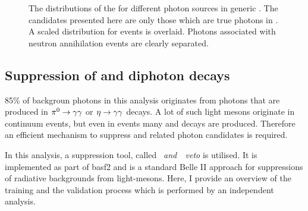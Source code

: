 \begin{figure}[htbp!]
    \centering
    \caption{\label{fig:zmva_distribution_sources} The distributions of the \ZMVA for different photon sources in generic \MC.
    The candidates presented here are only those which are true photons in .
    A scaled \ZMVA distribution for \BtoXsgamma events is overlaid.
    Photons associated with neutron annihilation events are clearly separated.}
\end{figure}

\subsection{Suppression of \texorpdfstring{\piz}{pi0} and \texorpdfstring{\eta}{eta} diphoton decays}\label{sec:selection_vetos}

85\% of backgroun photons in this analysis originates from photons that are produced in $\pi^0\rightarrow\gamma\gamma$ or $\eta\rightarrow\gamma\gamma$ decays.
A lot of such light mesons originate in continuum events, but even in \BB events many \piz and \eta decays are produced.
Therefore an efficient mechanism to suppress \piz and \eta related photon candidates is required.

In this analysis, a suppression tool, called \textit{\piz~and~\eta~veto} is utilised.
It is implemented as part of basf2 and is a standard Belle II approach for suppressions of radiative backgrounds from light-mesons.
Here, I provide an overview of the training and the validation process which is performed by an independent analysis.

